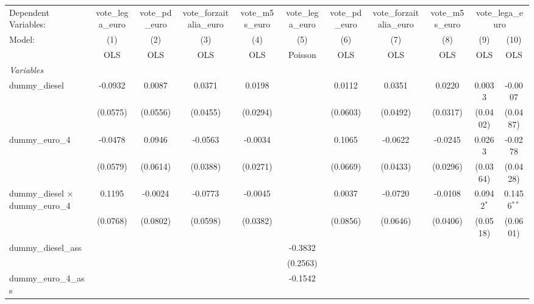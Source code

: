 \begingroup
\centering
\begin{tabular}{lcccccccccc}
   \tabularnewline \midrule \midrule
   Dependent Variables: & vote\_lega\_euro & vote\_pd\_euro & vote\_forzaitalia\_euro & vote\_m5s\_euro & vote\_lega\_euro & vote\_pd\_euro & vote\_forzaitalia\_euro & vote\_m5s\_euro & \multicolumn{2}{c}{vote\_lega\_euro}\\
   Model:                                    & (1)      & (2)      & (3)      & (4)      & (5)          & (6)      & (7)      & (8)      & (9)          & (10)\\  
                                             &  OLS     & OLS      & OLS      & OLS      & Poisson      & OLS      & OLS      & OLS      & OLS          & OLS\\  
   \midrule
   \emph{Variables}\\
   dummy\_diesel                             & -0.0932  & 0.0087   & 0.0371   & 0.0198   &              & 0.0112   & 0.0351   & 0.0220   & 0.0033       & -0.0007\\   
                                             & (0.0575) & (0.0556) & (0.0455) & (0.0294) &              & (0.0603) & (0.0492) & (0.0317) & (0.0402)     & (0.0487)\\   
   dummy\_euro\_4                            & -0.0478  & 0.0946   & -0.0563  & -0.0034  &              & 0.1065   & -0.0622  & -0.0245  & 0.0263       & -0.0278\\   
                                             & (0.0579) & (0.0614) & (0.0388) & (0.0271) &              & (0.0669) & (0.0433) & (0.0296) & (0.0364)     & (0.0428)\\   
   dummy\_diesel $\times$ dummy\_euro\_4     & 0.1195   & -0.0024  & -0.0773  & -0.0045  &              & 0.0037   & -0.0720  & -0.0108  & 0.0942$^{*}$ & 0.1456$^{**}$\\   
                                             & (0.0768) & (0.0802) & (0.0598) & (0.0382) &              & (0.0856) & (0.0646) & (0.0406) & (0.0518)     & (0.0601)\\   
   dummy\_diesel\_ass                        &          &          &          &          & -0.3832      &          &          &          &              &   \\   
                                             &          &          &          &          & (0.2563)     &          &          &          &              &   \\   
   dummy\_euro\_4\_ass                       &          &          &          &          & -0.1542      &          &          &          &              &   \\   

\end{tabular}
